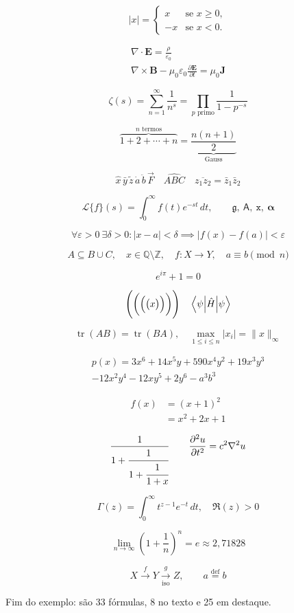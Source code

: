 \documentclass{article}
\begin{document}
\[ |x| = \begin{cases} x & \text{se } x \geq 0, \\ -x & \text{se } x < 0. \end{cases} \]

\begin{gather}
  \nabla \cdot \mathbf{E} = \frac{\rho}{\varepsilon_0} \\
  \nabla \times \mathbf{B} - \mu_0 \varepsilon_0 \frac{\partial \mathbf{E}}{\partial t} = \mu_0 \mathbf{J}
\end{gather}

\[ \zeta(s) = \sum_{n=1}^{\infty} \frac{1}{n^s} = \prod_{p \text{ primo}} \frac{1}{1 - p^{-s}} \]

\[ \overbrace{1 + 2 + \cdots + n}^{n \text{ termos}} = \underbrace{\frac{n(n+1)}{2}}_{\text{Gauss}} \]

\[ \hat{x}\,\bar{y}\,\tilde{z}\,\dot{a}\,\ddot{b}\,\vec{F} \quad \widehat{ABC} \quad \overline{z_1 z_2} = \bar{z}_1 \bar{z}_2 \]

\[ \mathcal{L}\{f\}(s) = \int_0^{\infty} f(t) e^{-st}\,dt, \qquad \mathfrak{g}, \ \mathsf{A}, \ \mathtt{x}, \ \boldsymbol{\alpha} \]

\[ \forall \varepsilon > 0\ \exists \delta > 0 : |x - a| < \delta \implies |f(x) - f(a)| < \varepsilon \]

\[ A \subseteq B \cup C, \quad x \in \mathbb{Q} \setminus \mathbb{Z}, \quad f \colon X \to Y, \quad a \equiv b \pmod{n} \]

\begin{equation}
  \boxed{e^{i\pi} + 1 = 0} \tag{Euler}
\end{equation}

\[ \Biggl( \biggl( \Bigl( \bigl( x \bigr) \Bigr) \biggr) \Biggr) \quad \left\langle \psi \middle| \hat{H} \middle| \psi \right\rangle \]

\[ \operatorname{tr}(AB) = \operatorname{tr}(BA), \quad \max_{1 \le i \le n} |x_i| = \|x\|_\infty \]

\begin{multline}
  p(x) = 3x^6 + 14x^5y + 590x^4y^2 + 19x^3y^3 \\
  - 12x^2y^4 - 12xy^5 + 2y^6 - a^3b^3
\end{multline}

\begin{equation}
  \begin{split}
    f(x) &= (x+1)^2 \\
         &= x^2 + 2x + 1
  \end{split}
\end{equation}

\[ \frac{1}{1 + \cfrac{1}{1 + \cfrac{1}{1 + x}}} \qquad \frac{\partial^2 u}{\partial t^2} = c^2 \nabla^2 u \]

\[ \Gamma(z) = \int_0^\infty t^{z-1} e^{-t}\,dt, \quad \Re(z) > 0 \]

\[ \lim_{n \to \infty} \left( 1 + \frac{1}{n} \right)^n = e \approx 2{,}71828 \]

\[ X \xrightarrow{f} Y \xrightarrow[\text{iso}]{g} Z, \qquad a \stackrel{\text{def}}{=} b \]

Fim do exemplo: são 33 fórmulas, 8 no texto e 25 em destaque.
\end{document}
